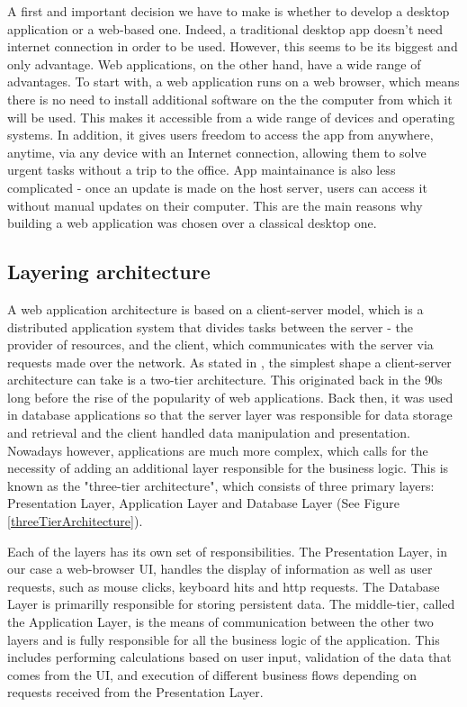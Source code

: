A first and important decision we have to make is whether to develop a desktop application or a web-based one. Indeed, a traditional desktop app doesn't need internet connection in order to be used. However, this seems to be its biggest and only advantage. Web applications, on the other hand, have a wide range of advantages. To start with, a web application runs on a web browser, which means there is no need to install additional software on the the computer from which it will be used. This makes it accessible from a wide range of devices and operating systems. In addition, it gives users freedom to access the app from anywhere, anytime, via any device with an Internet connection, allowing them to solve urgent tasks without a trip to the office. App maintainance is also less complicated - once an update is made on the host server, users can access it without manual updates on their computer. This are the main reasons why building a web application was chosen over a classical desktop one.

\subsection{Layering architecture}
\label{subsection:layeringArchitecture}

A web application architecture is based on a client-server model, which is a distributed application system that divides tasks between the server - the provider of resources, and the client, which communicates with the server via requests made over the network. As stated in \cite{databaseProgrammingWithJdbcAndJava}, the simplest shape a client-server architecture can take is a two-tier architecture. This originated back in the 90s long before the rise of the popularity of web applications. Back then, it was used in database applications so that the server layer was responsible for data storage and retrieval and the client handled data manipulation and presentation. Nowadays however, applications are much more complex, which calls for the necessity of adding an additional layer responsible for the business logic. This is known as the "three-tier architecture", which consists of three primary layers: Presentation Layer, Application Layer and Database Layer (See Figure \ref{threeTierArchitecture}).

Each of the layers has its own set of responsibilities. The Presentation Layer, in our case a web-browser UI, handles the display of information as well as user requests, such as mouse clicks, keyboard hits and http requests. The Database Layer is primarilly responsible for storing persistent data. The middle-tier, called the Application Layer, is the means of communication between the other two layers and is fully responsible for all the business logic of the application. This includes performing calculations based on user input, validation of the data that comes from the UI, and execution of different business flows depending on requests received from the Presentation Layer.

